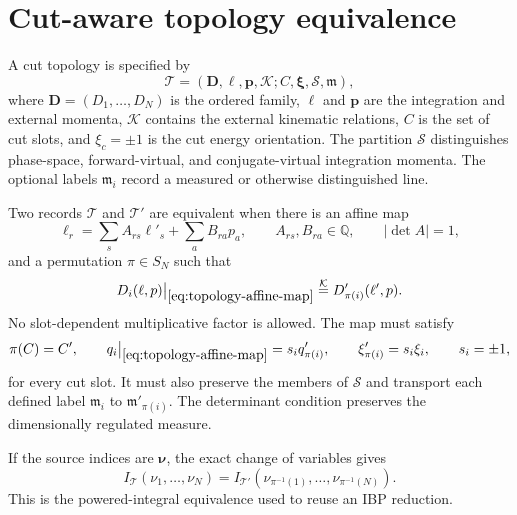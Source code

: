 \section{Cut-aware topology equivalence}
\label{app:topology-equivalence}

A cut topology is specified by
\begin{equation}
 \mathcal T=(\boldsymbol D,\boldsymbol\ell,\boldsymbol p,\mathcal K;
 C,\boldsymbol\xi,\mathcal S,\boldsymbol{\mathfrak m}),
 \label{eq:cut-topology-record}
\end{equation}
where $\boldsymbol D=(D_1,\ldots,D_N)$ is the ordered family,
$\boldsymbol\ell$ and $\boldsymbol p$ are the integration and external
momenta, $\mathcal K$ contains the external kinematic relations, $C$ is the
set of cut slots, and $\xi_c=\pm1$ is the cut energy orientation.  The
partition $\mathcal S$ distinguishes phase-space, forward-virtual, and
conjugate-virtual integration momenta.  The optional labels
$\mathfrak m_i$ record a measured or otherwise distinguished line.

Two records $\mathcal T$ and $\mathcal T'$ are equivalent when there is an
affine map
\begin{equation}
 \ell_r=\sum_sA_{rs}\ell'_s+\sum_aB_{ra}p_a,
 \qquad A_{rs},B_{ra}\in\mathbb Q,
 \qquad |\det A|=1,
 \label{eq:topology-affine-map}
\end{equation}
and a permutation $\pi\in S_N$ such that
\begin{equation}
 D_i(\ell,p)\big|_{\eqref{eq:topology-affine-map}}
 \stackrel{\mathcal K}{=}D'_{\pi(i)}(\ell',p).
 \label{eq:topology-denominator-map}
\end{equation}
No slot-dependent multiplicative factor is allowed.  The map must satisfy
\begin{equation}
 \pi(C)=C',
 \qquad
 q_i\big|_{\eqref{eq:topology-affine-map}}
 =s_iq'_{\pi(i)},
 \qquad
 \xi'_{\pi(i)}=s_i\xi_i,
 \qquad s_i=\pm1,
 \label{eq:topology-cut-map}
\end{equation}
for every cut slot.  It must also preserve the members of $\mathcal S$ and
transport each defined label $\mathfrak m_i$ to
$\mathfrak m'_{\pi(i)}$.  The determinant condition preserves the
dimensionally regulated measure.

If the source indices are $\boldsymbol\nu$, the exact change of variables
gives
\begin{equation}
 I_{\mathcal T}(\nu_1,\ldots,\nu_N)
 =I_{\mathcal T'}
 (\nu_{\pi^{-1}(1)},\ldots,\nu_{\pi^{-1}(N)}).
 \label{eq:topology-index-map}
\end{equation}
This is the powered-integral equivalence used to reuse an IBP reduction.

